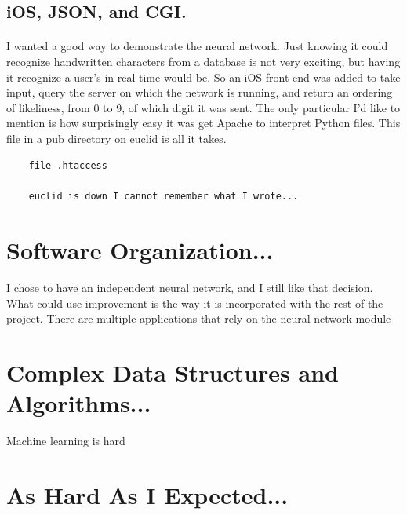 \documentclass{article}
\begin{document}
\subsection{iOS, JSON, and CGI.}
    \paragraph{}I wanted a good way to demonstrate the neural network. Just knowing it could
    recognize handwritten characters from a database is not very exciting, but having it 
    recognize a user's in real time would be. So an iOS front end was added to take input, 
    query the server on which the network is running, and return an ordering of likeliness, 
    from 0 to 9, of which digit it was sent. The only particular I'd like to mention is how
    surprisingly easy it was get Apache to interpret Python files. This file in a pub
    directory on euclid is all it takes. \\

    \begin{lstlisting}
    file .htaccess

    euclid is down I cannot remember what I wrote...
    \end{lstlisting}

\section{Software Organization...}
    \paragraph{}I chose to have an independent neural network, and I still like that 
    decision. What could use improvement is the way it is incorporated with the rest of 
    the project. There are multiple applications that rely on the neural network module

\section{Complex Data Structures and Algorithms...}
    Machine learning is hard

\section{As Hard As I Expected...}
\end{document}
